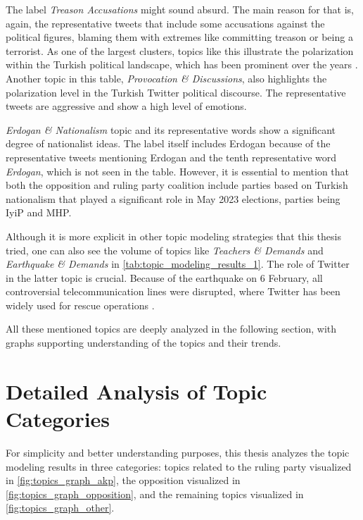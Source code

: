 The label \textit{Treason Accusations} might sound absurd. The main reason for that is, again, 
the representative tweets that include some accusations against the political figures, 
blaming them with extremes like committing treason or being a terrorist. As one of the largest 
clusters, topics like this illustrate the polarization within the Turkish political landscape, 
which has been prominent over the years \parencite{cevik_turkey_polarization_2018}. 
Another topic in this table, \textit{Provocation \& Discussions}, also highlights the 
polarization level in the Turkish Twitter political discourse. The representative tweets are 
aggressive and show a high level of emotions.

\textit{Erdogan \& Nationalism} topic and its representative words show a significant degree 
of nationalist ideas. The label itself includes Erdogan because of the representative tweets 
mentioning Erdogan and the tenth representative word \textit{Erdogan}, which is not seen in the table. 
However, it is essential to mention that both the opposition and ruling party coalition 
include parties based on Turkish nationalism that played a significant role in May 2023 
elections, parties being \ac{IyiP} and \ac{MHP}.

Although it is more explicit in other topic modeling strategies that this thesis tried, 
one can also see the volume of topics like \textit{Teachers \& Demands} and \textit{Earthquake \& Demands} 
in \autoref{tab:topic_modeling_results_1}. The role of Twitter in the latter topic is crucial. 
Because of the earthquake on 6 February, all controversial telecommunication lines were disrupted, 
where Twitter has been widely used for rescue operations \parencite{cevik_aksoy_turkey_earthquake_2023}.

All these mentioned topics are deeply analyzed in the following section, with 
graphs supporting understanding of the topics and their trends.

\section{Detailed Analysis of Topic Categories}

For simplicity and better understanding purposes, this thesis analyzes the topic modeling results 
in three categories: topics related to the ruling party visualized in \autoref{fig:topics_graph_akp}, 
the opposition visualized in \autoref{fig:topics_graph_opposition}, and the remaining topics 
visualized in \autoref{fig:topics_graph_other}. 

